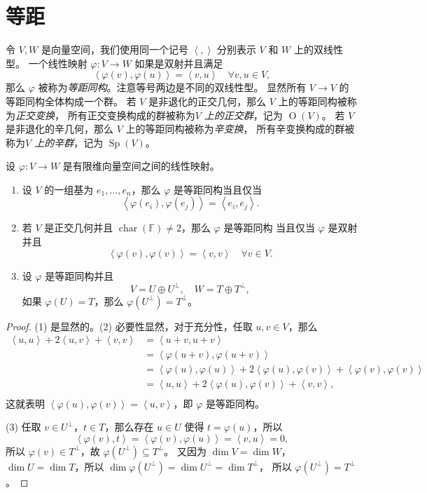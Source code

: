 \documentclass[fontset=none,zihao=-4]{Notes}
\DeclareMathOperator\Or{O}
\DeclareMathOperator\Sp{Sp}
\DeclareMathOperator\cha{char}
\newcommand{\inn}[1]{\left\langle#1\right\rangle}
\begin{document}
\section{等距}

令 $V,W$ 是向量空间，我们使用同一个记号 $\inn{,}$ 分别表示 $V$ 和 $W$ 上的双线性型。
一个线性映射 $\varphi:V\to W$ 如果是双射并且满足
\[
  \inn{\varphi(v),\varphi(u)}=\inn{v,u}\quad \forall v,u\in V,
\]
那么 $\varphi$ 被称为\emph{等距同构}。注意等号两边是不同的双线性型。
显然所有 $V\to V$ 的等距同构全体构成一个群。
若 $V$ 是非退化的正交几何，那么 $V$ 上的等距同构被称为\emph{正交变换}，
所有正交变换构成的群被称为\emph{$V$ 上的正交群}，记为 $\Or(V)$。
若 $V$ 是非退化的辛几何，那么 $V$ 上的等距同构被称为\emph{辛变换}，
所有辛变换构成的群被称为\emph{$V$ 上的辛群}，记为 $\Sp(V)$。

\begin{theorem}
  设 $\varphi:V\to W$ 是有限维向量空间之间的线性映射。
  \begin{enumerate}
    \item 设 $V$ 的一组基为 $e_1,\dots,e_n$，那么 $\varphi$ 是等距同构当且仅当
    \[
      \inn{\varphi(e_i),\varphi(e_j)}=\inn{e_i,e_j}.
    \]
    \item 若 $V$ 是正交几何并且 $\cha(\mathbb{F})\neq 2$，那么 $\varphi$ 是等距同构
    当且仅当 $\varphi$ 是双射并且
    \[
      \inn{\varphi(v),\varphi(v)}=\inn{v,v}\quad \forall v\in V.  
    \]
    \item 设 $\varphi$ 是等距同构并且
    \[
      V=U\oplus U^\bot,\quad W=T\oplus T^\bot,  
    \]
    如果 $\varphi(U)=T$，那么 $\varphi(U^\bot)=T^\bot$。
  \end{enumerate}
\end{theorem}
\begin{proof}
  (1) 是显然的。(2) 必要性显然，对于充分性，任取 $u,v\in V$，那么
  \begin{align*}
    \inn{u,u}+2\inn{u,v}+\inn{v,v}&=\inn{u+v,u+v}\\
    &=\inn{\varphi(u+v),\varphi(u+v)}  \\
    &=
    \inn{\varphi(u),\varphi(u)}+2\inn{\varphi(u),\varphi(v)}+\inn{\varphi(v),\varphi(v)}\\
    &=\inn{u,u}+2\inn{\varphi(u),\varphi(v)}+\inn{v,v},\\
  \end{align*}
  这就表明 $\inn{\varphi(u),\varphi(v)}=\inn{u,v}$，即 $\varphi$ 是等距同构。

  (3) 任取 $v\in U^\bot$，$t\in T$，那么存在 $u\in U$ 使得 $t=\varphi(u)$，所以
  \[
    \inn{\varphi(v),t}=\inn{\varphi(v),\varphi(u)}=\inn{v,u}=0,  
  \]
  所以 $\varphi(v)\in T^\bot$，故 $\varphi(U^\bot)\subseteq T^\bot$。
  又因为 $\dim V=\dim W$，$\dim U=\dim T$，所以 $\dim\varphi(U^\bot)=\dim U^\bot=\dim T^\bot$，
  所以 $\varphi(U^\bot)=T^\bot$。
\end{proof}
\end{document}
